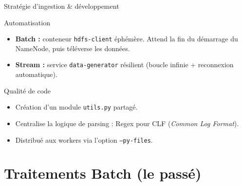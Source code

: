 \documentclass[aspectratio=169]{beamer}
\begin{document}
\begin{frame}{Stratégie d'ingestion \& développement}
  \begin{block}{Automatisation}
    \begin{itemize}
        \item \textbf{Batch :} conteneur \texttt{hdfs-client} éphémère. Attend la fin du démarrage du NameNode, puis téléverse les données.
        \item \textbf{Stream :} service \texttt{data-generator} résilient (boucle infinie + reconnexion automatique).
    \end{itemize}
  \end{block}

  \begin{block}{Qualité de code}
    \begin{itemize}
        \item Création d'un module \texttt{utils.py} partagé.
        \item Centralise la logique de parsing : Regex pour CLF (\textit{Common Log Format}).
        \item Distribué aux workers via l'option \texttt{--py-files}.
    \end{itemize}
  \end{block}
\end{frame}

\section{Traitements Batch (le passé)}
\end{document}
